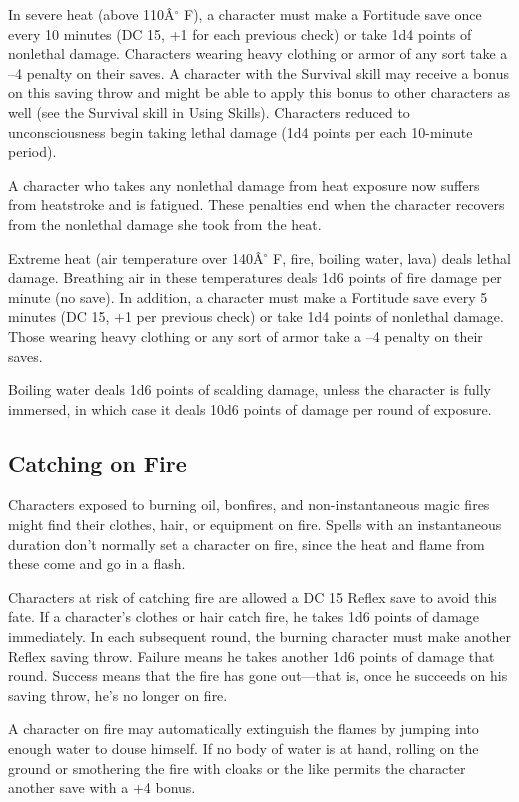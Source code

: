 In severe heat (above 110\^A\mbox{${}^\circ$} F), a character must make a Fortitude save once every 10 minutes (DC 15, +1 for each previous check) or take 1d4 points of nonlethal damage. Characters wearing heavy clothing or armor of any sort take a --4 penalty on their saves. A character with the Survival skill may receive a bonus on this saving throw and might be able to apply this bonus to other characters as well (see the Survival skill in Using Skills). Characters reduced to unconsciousness begin taking lethal damage (1d4 points per each 10-minute period).
				
A character who takes any nonlethal damage from heat exposure now suffers from heatstroke and is fatigued. These penalties end when the character recovers from the nonlethal damage she took from the heat.
				
Extreme heat (air temperature over 140\^A\mbox{${}^\circ$} F, fire, boiling water, lava) deals lethal damage. Breathing air in these temperatures deals 1d6 points of fire damage per minute (no save). In addition, a character must make a Fortitude save every 5 minutes (DC 15, +1 per previous check) or take 1d4 points of nonlethal damage. Those wearing heavy clothing or any sort of armor take a --4 penalty on their saves.
				
Boiling water deals 1d6 points of scalding damage, unless the character is fully immersed, in which case it deals 10d6 points of damage per round of exposure.
				
\subsection{Catching on Fire}

				
Characters exposed to burning oil, bonfires, and non-instantaneous magic fires might find their clothes, hair, or equipment on fire. Spells with an instantaneous duration don't normally set a character on fire, since the heat and flame from these come and go in a flash.
				
Characters at risk of catching fire are allowed a DC 15 Reflex save to avoid this fate. If a character's clothes or hair catch fire, he takes 1d6 points of damage immediately. In each subsequent round, the burning character must make another Reflex saving throw. Failure means he takes another 1d6 points of damage that round. Success means that the fire has gone out---that is, once he succeeds on his saving throw, he's no longer on fire.
				
A character on fire may automatically extinguish the flames by jumping into enough water to douse himself. If no body of water is at hand, rolling on the ground or smothering the fire with cloaks or the like permits the character another save with a +4 bonus.
				
